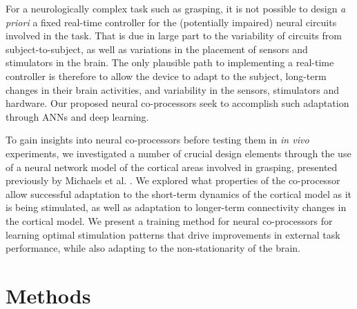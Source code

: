 \documentclass[12pt]{iopart}
\begin{document}
For a neurologically complex task such as grasping, it is not possible to design
\textit{a priori} a fixed real-time controller for the (potentially impaired) neural circuits involved in the task. That is
due in large part to the variability of circuits from subject-to-subject,
as well as variations in the placement of sensors and stimulators in the
brain. The only plausible path to implementing a real-time controller is therefore to allow the device to adapt to the subject,
long-term changes in their brain activities, and variability in the sensors, stimulators and hardware. Our proposed neural
co-processors seek to accomplish such adaptation through ANNs and deep learning.

To gain insights into neural co-processors before testing them in \textit{in vivo} experiments, we investigated a number of crucial design elements through the use of a neural network model of the cortical areas involved in 
grasping, presented previously by Michaels et al. \cite{michaels.mrnn}. We
explored what properties of the co-processor allow
successful adaptation to the short-term dynamics of the cortical model as it is being stimulated,
as well as adaptation to longer-term connectivity changes in the cortical model.
We present a training method for neural co-processors for learning optimal stimulation patterns that drive improvements in external task performance,
while also adapting to the non-stationarity of the brain.

\section{Methods}
\end{document}
